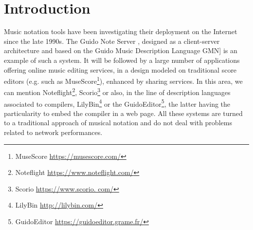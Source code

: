 \documentclass{article}
\title{\papertitle}
\begin{document}
%
\capstartfalse
\maketitle
\capstarttrue
%
\begin{abstract}
We present an online environment for the design of musical scores, which also allows the embedding of signal processors and thus the publication of electronic works. This environment is part of the INScore project, which latest version has been transcribed into WebAssembly/Javascript, to provide in a web browser both the diversity of music representations supported by INScore, the interaction capabilities and all the dynamic aspects of the score as offered by the native version.

After some historical elements about distributed music scores, we will make some reminders about the INScore project and its associated description language. We will then describe the architecture of the system and the choices made for its portability to the Web. Then we will present the extensions specific to the Javascript version and in particular the support of signal processing objects. 
Finally, we will show how INScore's communication system has been extended to allow online partition control from a native version of INScore, paving the way for real-time performance on the web.

\end{abstract}


\section{Introduction}\label{sec:introduction}

Music notation tools have been investigating their deployment on the Internet since the late 1990s. The Guido Note Server \cite{renz98}, designed as a client-server architecture and based on the Guido Music Description Language \cite{hoos98} GMN] is an example of such a system. It will be followed by a large number of applications offering online music editing services, in a design modeled on traditional score editors (e.g. such as MuseScore\footnote{MuseScore \url{https://musescore.com/}}), enhanced by sharing services. 
In this area, we can mention Noteflight\footnote{Noteflight \url{https://www.noteflight.com/}}, Scorio\footnote{Scorio \url{https://www.scorio. com/}} or also, in the line of description languages associated to compilers, LilyBin\footnote{LilyBin \url{http://lilybin.com/}} or the GuidoEditor\footnote{GuidoEditor \url{https://guidoeditor.grame.fr/}}, the latter having the particularity to embed the compiler in a web page.
All these systems are turned to a traditional approach of musical notation and do not deal with problems related to network performances.
\end{document}

